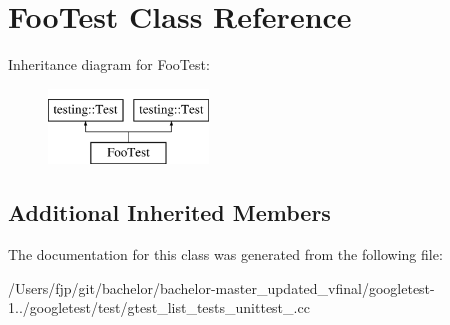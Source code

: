 \hypertarget{class_foo_test}{}\section{Foo\+Test Class Reference}
\label{class_foo_test}
Inheritance diagram for Foo\+Test\+:\begin{figure}[H]
\begin{center}
\leavevmode
\includegraphics[height=2.000000cm]{class_foo_test}
\end{center}
\end{figure}
\subsection*{Additional Inherited Members}


The documentation for this class was generated from the following file\+:\begin{DoxyCompactItemize}
\item 
/\+Users/fjp/git/bachelor/bachelor-\/master\+\_\+updated\+\_\+vfinal/googletest-\/1../googletest/test/gtest\+\_\+list\+\_\+tests\+\_\+unittest\+\_\+.\+cc\end{DoxyCompactItemize}
